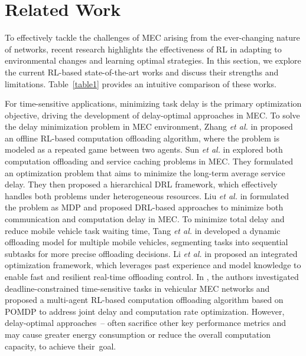 \documentclass[12pt,draftclsnofoot,onecolumn]{IEEEtran}
\begin{document}
	
	
	
	
	\color{blue}
	\section{Related Work}
	\label{section:II}
	
	
	
	To effectively tackle the challenges of MEC arising from the ever-changing nature of networks, recent research highlights the effectiveness of RL in adapting to environmental changes and learning optimal strategies. In this section, we explore the current RL-based state-of-the-art works and discuss their strengths and limitations. Table~\ref{table1} provides an intuitive comparison of these works.

	For time-sensitive applications, minimizing task delay is the primary optimization objective, driving the development of delay-optimal approaches in MEC. 
	To solve the delay minimization problem in MEC environment, Zhang \textit{et al.} in \cite{zhang2023offline} proposed an offline RL-based computation offloading algorithm, where the problem is modeled as a repeated game between two agents.
	Sun \textit{et al.} in \cite{sun2024hierarchical} explored both computation offloading and service caching problems in MEC. They formulated an optimization problem that aims to minimize the long-term average service delay. They then proposed a hierarchical DRL framework, which effectively handles both problems under heterogeneous resources. Liu \textit{et al.} in \cite{liu2022deep} formulated the problem as MDP and proposed DRL-based approaches to minimize both communication and computation delay in MEC.
	To minimize total delay and reduce mobile vehicle task waiting time, Tang \textit{et al.} in \cite{tang2022double} developed a dynamic offloading model for multiple mobile vehicles, segmenting tasks into sequential subtasks for more precise offloading decisions.
	Li \textit{et al.} in \cite{li2022integrated} proposed an integrated optimization framework, which leverages past experience and model knowledge to enable fast and resilient real-time offloading control. 
	In \cite{wei2023many}, the authors investigated deadline-constrained time-sensitive tasks in vehicular MEC networks and proposed a multi-agent RL-based computation offloading algorithm based on POMDP to address joint delay and computation rate optimization. However, delay-optimal approaches~\cite{zhang2023offline}--\cite{wei2023many} often sacrifice other key performance metrics and may cause greater energy consumption or reduce the overall computation capacity, to achieve their~goal. 
	
\end{document}
